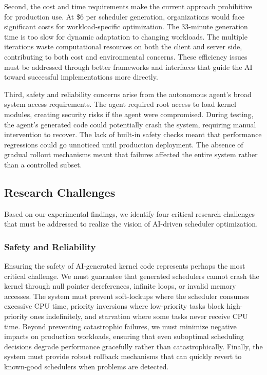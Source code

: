 Second, the cost and time requirements make the current approach prohibitive for production use. At \$6 per scheduler generation, organizations would face significant costs for workload-specific optimization. The 33-minute generation time is too slow for dynamic adaptation to changing workloads. The multiple iterations waste computational resources on both the client and server side, contributing to both cost and environmental concerns. These efficiency issues must be addressed through better frameworks and interfaces that guide the AI toward successful implementations more directly.

Third, safety and reliability concerns arise from the autonomous agent's broad system access requirements. The agent required root access to load kernel modules, creating security risks if the agent were compromised. During testing, the agent's generated code could potentially crash the system, requiring manual intervention to recover. The lack of built-in safety checks meant that performance regressions could go unnoticed until production deployment. The absence of gradual rollout mechanisms meant that failures affected the entire system rather than a controlled subset.

\subsection{Research Challenges}

Based on our experimental findings, we identify four critical research challenges that must be addressed to realize the vision of AI-driven scheduler optimization.

\subsubsection{Safety and Reliability}

Ensuring the safety of AI-generated kernel code represents perhaps the most critical challenge. We must guarantee that generated schedulers cannot crash the kernel through null pointer dereferences, infinite loops, or invalid memory accesses. The system must prevent soft-lockups where the scheduler consumes excessive CPU time, priority inversions where low-priority tasks block high-priority ones indefinitely, and starvation where some tasks never receive CPU time. Beyond preventing catastrophic failures, we must minimize negative impacts on production workloads, ensuring that even suboptimal scheduling decisions degrade performance gracefully rather than catastrophically. Finally, the system must provide robust rollback mechanisms that can quickly revert to known-good schedulers when problems are detected.

